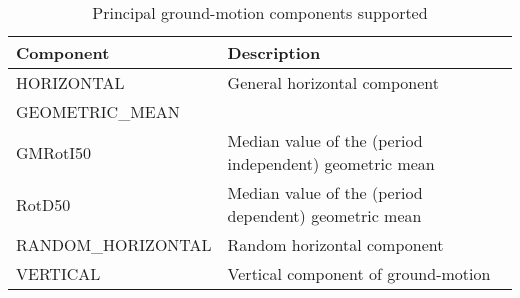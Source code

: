 \begin{table}[!h]
\centering
\begin{tabular}{|p{6cm}p{7cm}|}
\hline
\rowcolor{anti-flashwhite}
\bf{Component} & \bf{Description} \\
\hline 
HORIZONTAL & General horizontal component \\
GEOMETRIC\_MEAN &  \\
GMRotI50 & Median value of the (period independent) geometric mean 
           \parencite{boore2006} \\
RotD50 & Median value of the (period dependent) geometric mean 
         \parencite{boore2010} \\
RANDOM\_HORIZONTAL & Random horizontal component \\
VERTICAL & Vertical component of ground-motion\\
\hline
\end{tabular}
\caption{Principal ground-motion components supported}
\label{tab:hor_comp} 
\end{table}
